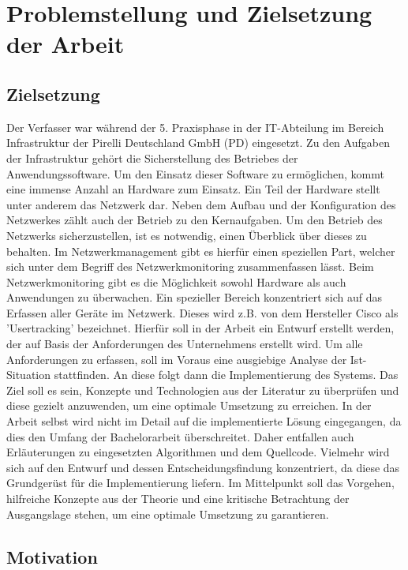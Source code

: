 \chapter{Problemstellung und Zielsetzung der Arbeit}
\label{cha:Einleitung}

\section{Zielsetzung}

Der Verfasser war während der 5. Praxisphase in der IT-Abteilung im Bereich Infrastruktur der Pirelli Deutschland GmbH (PD) eingesetzt.
Zu den Aufgaben der Infrastruktur gehört die Sicherstellung des Betriebes der Anwendungssoftware.
Um den Einsatz dieser Software zu ermöglichen, kommt eine immense Anzahl an Hardware zum Einsatz.
Ein Teil der Hardware stellt unter anderem das Netzwerk dar.
Neben dem Aufbau und der Konfiguration des Netzwerkes zählt auch der Betrieb zu den Kernaufgaben.
Um den Betrieb des Netzwerks sicherzustellen, ist es notwendig, einen Überblick über dieses zu behalten.
Im Netzwerkmanagement gibt es hierfür einen speziellen Part, welcher sich unter dem Begriff des Netzwerkmonitoring zusammenfassen lässt.
Beim Netzwerkmonitoring gibt es die Möglichkeit sowohl Hardware als auch Anwendungen zu überwachen.
Ein spezieller Bereich konzentriert sich auf das Erfassen aller Geräte im Netzwerk.
Dieses wird z.B. von dem Hersteller Cisco als 'Usertracking' bezeichnet.
Hierfür soll in der Arbeit ein Entwurf erstellt werden, der auf Basis der Anforderungen des Unternehmens erstellt wird.
Um alle Anforderungen zu erfassen, soll im Voraus eine ausgiebige Analyse der Ist-Situation stattfinden.
An diese folgt dann die Implementierung des Systems.
Das Ziel soll es sein, Konzepte und Technologien aus der Literatur zu überprüfen und diese gezielt anzuwenden, um eine optimale Umsetzung zu erreichen. 
In der Arbeit selbst wird nicht im Detail auf die implementierte Lösung eingegangen, da dies den Umfang der Bachelorarbeit überschreitet.
Daher entfallen auch Erläuterungen zu eingesetzten Algorithmen und dem Quellcode.
Vielmehr wird sich auf den Entwurf und dessen Entscheidungsfindung konzentriert, da diese das Grundgerüst für die Implementierung liefern.
Im Mittelpunkt soll das Vorgehen, hilfreiche Konzepte aus der Theorie und eine kritische Betrachtung der Ausgangslage stehen, um eine optimale Umsetzung zu garantieren.\\


\section{Motivation}

